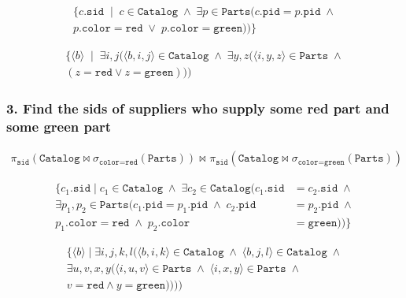 \begin{align*}
  \{c.\mathtt{sid} \; \mid \; c \in \mathtt{Catalog} \; \wedge \; \exists p \in \mathtt{Parts} (c.\mathtt{pid} = p.\mathtt{pid} \; \wedge \\
p.\mathtt{color} = \mathtt{red} \; \vee \; p.\mathtt{color} = \mathtt{green}))\}
\end{align*}

\begin{align*}
  \{\langle b \rangle \; \mid \; \exists i, j (\langle b,i,j \rangle  \in \mathtt{Catalog} \; \wedge \; \exists y, z
 (\langle i, y, z \rangle  \in \mathtt{Parts} \; \wedge \\
 (z = \mathtt{red} \vee z = \mathtt{green})))
\end{align*}

\subsubsection{3. Find the sids of suppliers who supply some red part and some green part}

\begin{align*}
  \pi_{\mathtt{sid}}(\texttt{Catalog} \bowtie \sigma_{\texttt{color} = \texttt{red}}(\texttt{Parts})) 
  \bowtie_{} \pi_{\mathtt{sid}}(\texttt{Catalog} \bowtie \sigma_{\texttt{color} = \texttt{green}}(\texttt{Parts}))
\end{align*}

\begin{align*}
  \{c_1.\mathtt{sid} \; | \; c_1 \in \mathtt{Catalog} \; \wedge \; \exists c_2 \in \mathtt{Catalog}(c_1.\mathtt{sid} &= c_2.\mathtt{sid} \; \wedge \\
  \exists p_1,p_2 \in \mathtt{Parts}(c_1.\mathtt{pid} = p_1.\mathtt{pid} \; \wedge \; c_2.\mathtt{pid} &= p_2.\mathtt{pid} \; \wedge \\
p_1.\mathtt{color} = \mathtt{red} \; \wedge \; p_2.\mathtt{color} &= \mathtt{green}))\}
\end{align*}

\begin{align*}
  \{\langle b \rangle  \; | \; \exists i,j,k,l(\langle b,i,k \rangle  \in \mathtt{Catalog} \; \wedge \; 
  \langle b,j,l \rangle  \in \mathtt{Catalog} \; \wedge \\
  \exists u, v, x, y(\langle i, u, v \rangle  \in \mathtt{Parts} \; \wedge \; \langle i, x, y \rangle  \in \mathtt{Parts} \; \wedge \\ 
  v = \mathtt{red} \wedge y = \mathtt{green})))) 
\end{align*}


